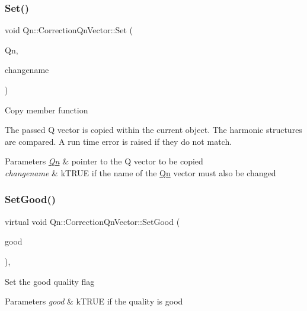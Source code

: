 \subsubsection{\texorpdfstring{Set()}{Set()}}
{\footnotesize\ttfamily void Qn\+::\+Correction\+Qn\+Vector\+::\+Set (\begin{DoxyParamCaption}\item[{\mbox{\hyperlink{classQn_1_1CorrectionQnVector}{Correction\+Qn\+Vector}} $\ast$}]{Qn,  }\item[{Bool\+\_\+t}]{changename }\end{DoxyParamCaption})}

Copy member function

The passed Q vector is copied within the current object. The harmonic structures are compared. A run time error is raised if they do not match. 
\begin{DoxyParams}{Parameters}
{\em \mbox{\hyperlink{namespaceQn}{Qn}}} & pointer to the Q vector to be copied \\
\hline
{\em changename} & k\+T\+R\+UE if the name of the \mbox{\hyperlink{namespaceQn}{Qn}} vector must also be changed \\
\hline
\end{DoxyParams}
\mbox{\label{classQn_1_1CorrectionQnVector_a71b91d6c9ed672d997f91421192974f6}} 
\subsubsection{\texorpdfstring{Set\+Good()}{SetGood()}}
{\footnotesize\ttfamily virtual void Qn\+::\+Correction\+Qn\+Vector\+::\+Set\+Good (\begin{DoxyParamCaption}\item[{Bool\+\_\+t}]{good }\end{DoxyParamCaption})\hspace{0.3cm}{\ttfamily [inline]}, {\ttfamily [virtual]}}

Set the good quality flag 
\begin{DoxyParams}{Parameters}
{\em good} & k\+T\+R\+UE if the quality is good \\
\hline
\end{DoxyParams}
\mbox{\label{classQn_1_1CorrectionQnVector_acc6c39c8247f6f43c13c1886c3a5bcd4}} 
